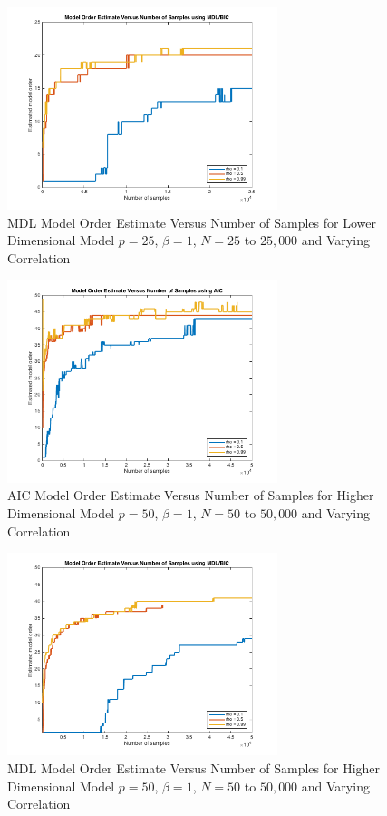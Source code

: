 \documentclass[journal]{IEEEtran}
\begin{document}
\begin{figure}[h]
\centering
\includegraphics[width=3.1in]{../images/consistency_mdl_rho_25.png}
\caption{MDL Model Order Estimate Versus Number of Samples for Lower Dimensional Model \(p = 25\), \(\beta = 1\), \(N = 25\) to \(25,000\) and Varying Correlation}
\label{fig:mdlcon25}
\end{figure}

\begin{figure}[h]
\centering
\includegraphics[width=3.1in]{../images/consistency_aic_rho_50.png}
\caption{AIC Model Order Estimate Versus Number of Samples for Higher Dimensional Model \(p = 50\), \(\beta = 1\), \(N = 50\) to \(50,000\) and Varying Correlation}
\label{fig:aiccon50}
\end{figure}

\begin{figure}[h]
\centering
\includegraphics[width=3.1in]{../images/consistency_mdl_rho_50.png}
\caption{MDL Model Order Estimate Versus Number of Samples for Higher Dimensional Model \(p = 50\), \(\beta = 1\), \(N = 50\) to \(50,000\) and Varying Correlation}
\label{fig:mdlcon50}
\end{figure}
\end{document}
